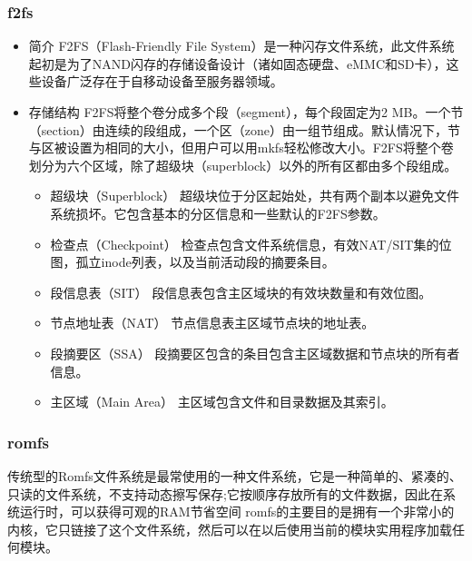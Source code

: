 \documentclass[UTF8,a4paper]{ctexart}
\begin{document}
\subsubsection{f2fs}
\begin{itemize}
\item 简介
F2FS（Flash-Friendly File System）是一种闪存文件系统，此文件系统起初是为了NAND闪存的存储设备设计（诸如固态硬盘、eMMC和SD卡），这些设备广泛存在于自移动设备至服务器领域。
\item 存储结构
F2FS将整个卷分成多个段（segment），每个段固定为2 MB。一个节（section）由连续的段组成，一个区（zone）由一组节组成。默认情况下，节与区被设置为相同的大小，但用户可以用mkfs轻松修改大小。F2FS将整个卷划分为六个区域，除了超级块（superblock）以外的所有区都由多个段组成。

	\begin{itemize}
		\item 超级块（Superblock）
		超级块位于分区起始处，共有两个副本以避免文件系统损坏。它包含基本的分区信息和一些默认的F2FS参数。
		\item 检查点（Checkpoint）
		检查点包含文件系统信息，有效NAT/SIT集的位图，孤立inode列表，以及当前活动段的摘要条目。
		\item 段信息表（SIT）
		段信息表包含主区域块的有效块数量和有效位图。
		\item 节点地址表（NAT）
		节点信息表主区域节点块的地址表。
		\item 段摘要区（SSA）
		段摘要区包含的条目包含主区域数据和节点块的所有者信息。
		\item 主区域（Main Area）
		主区域包含文件和目录数据及其索引。
	\end{itemize}
\end{itemize}

\subsubsection{romfs}
传统型的Romfs文件系统是最常使用的一种文件系统，它是一种简单的、紧凑的、只读的文件系统，不支持动态擦写保存;它按顺序存放所有的文件数据，因此在系统运行时，可以获得可观的RAM节省空间
romfs的主要目的是拥有一个非常小的内核，它只链接了这个文件系统，然后可以在以后使用当前的模块实用程序加载任何模块。
\end{document}
